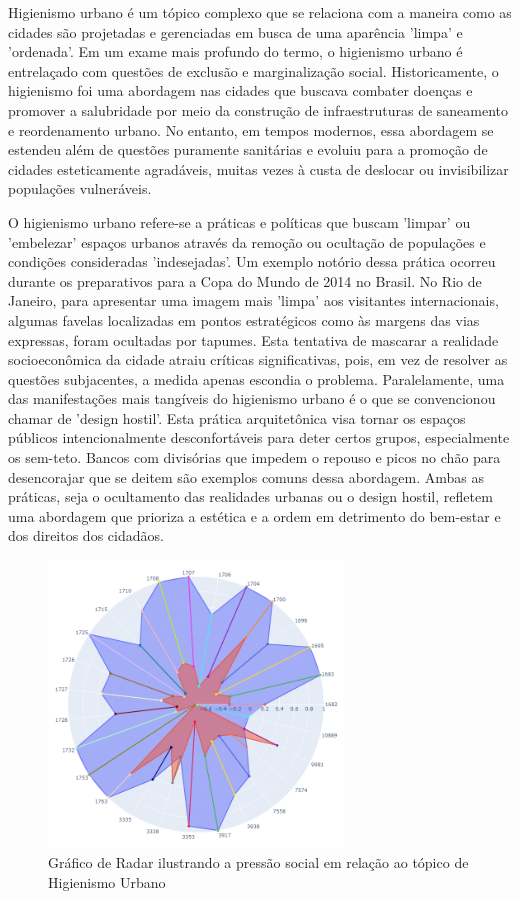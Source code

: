 Higienismo urbano é um tópico complexo que se relaciona com a maneira como as cidades são projetadas e gerenciadas em busca de uma aparência 'limpa' e 'ordenada'. Em um exame mais profundo do termo, o higienismo urbano é entrelaçado com questões de exclusão e marginalização social. Historicamente, o higienismo foi uma abordagem nas cidades que buscava combater doenças e promover a salubridade por meio da construção de infraestruturas de saneamento e reordenamento urbano. No entanto, em tempos modernos, essa abordagem se estendeu além de questões puramente sanitárias e evoluiu para a promoção de cidades esteticamente agradáveis, muitas vezes à custa de deslocar ou invisibilizar populações vulneráveis.

O higienismo urbano refere-se a práticas e políticas que buscam 'limpar' ou 'embelezar' espaços urbanos através da remoção ou ocultação de populações e condições consideradas 'indesejadas'. Um exemplo notório dessa prática ocorreu durante os preparativos para a Copa do Mundo de 2014 no Brasil. No Rio de Janeiro, para apresentar uma imagem mais 'limpa' aos visitantes internacionais, algumas favelas localizadas em pontos estratégicos como às margens das vias expressas, foram ocultadas por tapumes. Esta tentativa de mascarar a realidade socioeconômica da cidade atraiu críticas significativas, pois, em vez de resolver as questões subjacentes, a medida apenas escondia o problema. Paralelamente, uma das manifestações mais tangíveis do higienismo urbano é o que se convencionou chamar de 'design hostil'. Esta prática arquitetônica visa tornar os espaços públicos intencionalmente desconfortáveis para deter certos grupos, especialmente os sem-teto. Bancos com divisórias que impedem o repouso e picos no chão para desencorajar que se deitem são exemplos comuns dessa abordagem. Ambas as práticas, seja o ocultamento das realidades urbanas ou o design hostil, refletem uma abordagem que prioriza a estética e a ordem em detrimento do bem-estar e dos direitos dos cidadãos.

\begin{figure}[htb]
	\centering
	\includegraphics[width=0.7\textwidth]{images/social_barometer_homeland.png}
	\caption{Gráfico de Radar ilustrando a pressão social em relação ao tópico de Higienismo Urbano}
	\label{fig:social_barometer_homeland}
\end{figure}

